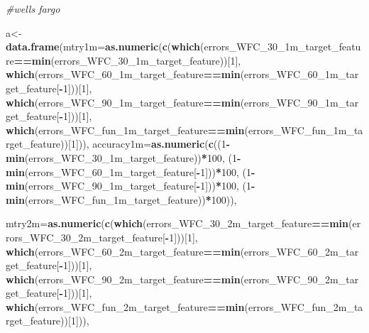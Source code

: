 \documentclass[]{article}
\newenvironment{Shaded}{\begin{snugshade}}{\end{snugshade}}
\newcommand{\KeywordTok}[1]{\textcolor[rgb]{0.13,0.29,0.53}{\textbf{#1}}}
\newcommand{\DataTypeTok}[1]{\textcolor[rgb]{0.13,0.29,0.53}{#1}}
\newcommand{\DecValTok}[1]{\textcolor[rgb]{0.00,0.00,0.81}{#1}}
\newcommand{\CommentTok}[1]{\textcolor[rgb]{0.56,0.35,0.01}{\textit{#1}}}
\newcommand{\OperatorTok}[1]{\textcolor[rgb]{0.81,0.36,0.00}{\textbf{#1}}}
\newcommand{\NormalTok}[1]{#1}
\begin{document}
\begin{Shaded}
\begin{Highlighting}[]
\CommentTok{#wells fargo}


\NormalTok{a<-}\KeywordTok{data.frame}\NormalTok{(}\DataTypeTok{mtry1m=}\KeywordTok{as.numeric}\NormalTok{(}\KeywordTok{c}\NormalTok{(}\KeywordTok{which}\NormalTok{(errors_WFC_30_1m_target_feature}\OperatorTok{==}\KeywordTok{min}\NormalTok{(errors_WFC_30_1m_target_feature))[}\DecValTok{1}\NormalTok{],}
                                    \KeywordTok{which}\NormalTok{(errors_WFC_60_1m_target_feature}\OperatorTok{==}\KeywordTok{min}\NormalTok{(errors_WFC_60_1m_target_feature[}\OperatorTok{-}\DecValTok{1}\NormalTok{]))[}\DecValTok{1}\NormalTok{],}
                                   \KeywordTok{which}\NormalTok{(errors_WFC_90_1m_target_feature}\OperatorTok{==}\KeywordTok{min}\NormalTok{(errors_WFC_90_1m_target_feature[}\OperatorTok{-}\DecValTok{1}\NormalTok{]))[}\DecValTok{1}\NormalTok{],}
                                   \KeywordTok{which}\NormalTok{(errors_WFC_fun_1m_target_feature}\OperatorTok{==}\KeywordTok{min}\NormalTok{(errors_WFC_fun_1m_target_feature))[}\DecValTok{1}\NormalTok{])),}
              \DataTypeTok{accuracy1m=}\KeywordTok{as.numeric}\NormalTok{(}\KeywordTok{c}\NormalTok{((}\DecValTok{1}\OperatorTok{-}\KeywordTok{min}\NormalTok{(errors_WFC_30_1m_target_feature))}\OperatorTok{*}\DecValTok{100}\NormalTok{,}
\NormalTok{                                    (}\DecValTok{1}\OperatorTok{-}\KeywordTok{min}\NormalTok{(errors_WFC_60_1m_target_feature[}\OperatorTok{-}\DecValTok{1}\NormalTok{]))}\OperatorTok{*}\DecValTok{100}\NormalTok{,}
\NormalTok{                                    (}\DecValTok{1}\OperatorTok{-}\KeywordTok{min}\NormalTok{(errors_WFC_90_1m_target_feature[}\OperatorTok{-}\DecValTok{1}\NormalTok{]))}\OperatorTok{*}\DecValTok{100}\NormalTok{,}
\NormalTok{                                    (}\DecValTok{1}\OperatorTok{-}\KeywordTok{min}\NormalTok{(errors_WFC_fun_1m_target_feature))}\OperatorTok{*}\DecValTok{100}\NormalTok{)),}
              
              
              \DataTypeTok{mtry2m=}\KeywordTok{as.numeric}\NormalTok{(}\KeywordTok{c}\NormalTok{(}\KeywordTok{which}\NormalTok{(errors_WFC_30_2m_target_feature}\OperatorTok{==}\KeywordTok{min}\NormalTok{(errors_WFC_30_2m_target_feature[}\OperatorTok{-}\DecValTok{1}\NormalTok{]))[}\DecValTok{1}\NormalTok{],}
                                    \KeywordTok{which}\NormalTok{(errors_WFC_60_2m_target_feature}\OperatorTok{==}\KeywordTok{min}\NormalTok{(errors_WFC_60_2m_target_feature[}\OperatorTok{-}\DecValTok{1}\NormalTok{]))[}\DecValTok{1}\NormalTok{],}
                                   \KeywordTok{which}\NormalTok{(errors_WFC_90_2m_target_feature}\OperatorTok{==}\KeywordTok{min}\NormalTok{(errors_WFC_90_2m_target_feature[}\OperatorTok{-}\DecValTok{1}\NormalTok{]))[}\DecValTok{1}\NormalTok{],}
                                   \KeywordTok{which}\NormalTok{(errors_WFC_fun_2m_target_feature}\OperatorTok{==}\KeywordTok{min}\NormalTok{(errors_WFC_fun_2m_target_feature))[}\DecValTok{1}\NormalTok{])),}
              

\end{Highlighting}
\end{Shaded}
\end{document}
